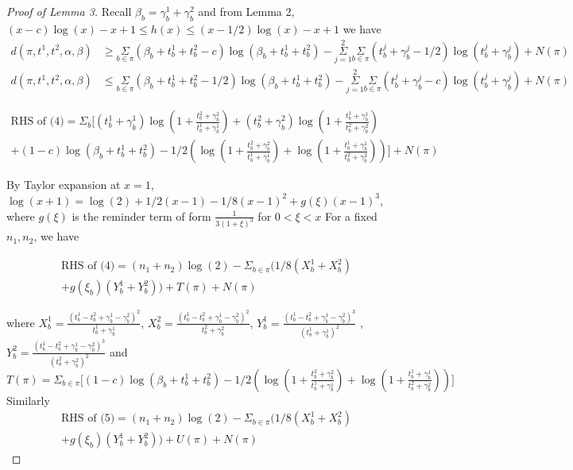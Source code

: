 \documentclass[aoas,preprint]{imsart}
\begin{document}
\begin{proof}[Proof of Lemma 3]
Recall $\beta_b = \gamma_b^1 + \gamma_b^2$ and from Lemma 2, $(x - c)\log(x) - x + 1 \leq h(x) \leq (x - 1/2)\log(x) - x + 1$ we have 
\begin{align}
d(\pi, t^1, t^2, \alpha, \beta) &\geq \underset{b\in \pi}\Sigma (\beta_b + t_b^1 + t_b^2 - c) \log(\beta_b  + t_b^1 + t_b^2) - \overset{2}{\underset{j = 1}{\Sigma}}\underset{b\in\pi}\Sigma (t_b^j + \gamma_b^j - 1/2) 
\log(t_b^j + \gamma_b^j) + N(\pi)\\
d(\pi, t^1, t^2, \alpha, \beta) &\leq \underset{b\in \pi}\Sigma (\beta_b + t_b^1 + t_b^2 - 1 / 2) \log(\beta_b  + t_b^1 + t_b^2) - \overset{2}{\underset{j = 1}{\Sigma}}\underset{b\in\pi}\Sigma (t_b^j + \gamma_b^j - c) 
\log(t_b^j + \gamma_b^j) + N(\pi)
\end{align}


\begin{eqnarray*}
\text{RHS of (4)} = \Sigma_b \big[ (t_b^1 + \gamma_b^1) \log(1 + \frac{t_b^2 + \gamma_b^2}{t_b^1 + \gamma_b^1})
 + (t_b^2 + \gamma_b^2) \log(1 + \frac{t_b^1 + \gamma_b^1}{t_b^2 + \gamma_b^2})\\
 + (1 - c) \log(\beta_b + t_b^1 + t_b^2) 
  - 1/2(\log(1 + \frac{t_b^2 + \gamma_b^2}{t_b^1 + \gamma_b^1}) + \log(1 + \frac{t_b^1 + \gamma_b^1}{t_b^2 + \gamma_b^2}))\big] + N(\pi)
\end{eqnarray*}

By Taylor expansion at $x= 1$, $\log(x + 1) = \log(2) + 1/2(x - 1) - 1/8(x - 1)^2 + g(\xi) (x - 1)^3$, where $g(\xi)$ is the reminder term of form $\frac{1}{3(1+\xi)^3}$ for $ 0 < \xi < x$
For a fixed $n_1, n_2$, we have 

\begin{eqnarray*}
\text{RHS of (4)} = (n_1 + n_2) \log(2)  - \Sigma_{b\in\pi}(1/8 (X_b^1 + X_b^2)\\
+ g(\xi_b) (Y_b^1 + Y_b^2) )+ T(\pi) + N(\pi)
\end{eqnarray*}

where $X_b^1 = \frac{(t_b^1 - t_b^2 + \gamma_b^1 - \gamma_b^2)^2}{t_b^1 + \gamma_b^1}$, $X_b^2 =  \frac{(t_b^1 - t_b^2 + \gamma_b^1 - \gamma_b^2)^2}{t_b^2 + \gamma_b^2}$,
$Y_b^1 = \frac{(t_b^1 - t_b^2 + \gamma_b^1 - \gamma_b^2)^3}{(t_b^1 + \gamma_b^1)^2} $ , $Y_b^2 =  \frac{(t_b^1 - t_b^2 + \gamma_b^1 - \gamma_b^2)^3}{(t_b^2 + \gamma_b^2)^2}$
and $T(\pi) = \Sigma_{b\in\pi}\big[(1 - c) \log(\beta_b + t_b^1 + t_b^2) 
  - 1/2(\log(1 + \frac{t_b^2 + \gamma_b^2}{t_b^1 + \gamma_b^1}) + \log(1 + \frac{t_b^1 + \gamma_b^1}{t_b^2 + \gamma_b^2}))\big]$\\
Similarly
\begin{eqnarray*}
\text{RHS of (5)} = (n_1 + n_2) \log(2)  -\Sigma_{b\in\pi}(1/8 (X_b^1 + X_b^2)\\
+ g(\xi_b) (Y_b^1 + Y_b^2)) + U(\pi) + N(\pi)
\end{eqnarray*}
  

\end{proof}
\end{document}
